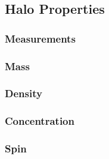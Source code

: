 \subsection{Halo Properties}
\label{subsec:halo_properties}



\subsubsection{Measurements}
\label{subsubsec:measurements}



\subsubsection{Mass}
\label{subsubsec:mass}



\subsubsection{Density}
\label{subsubsec:density}



\subsubsection{Concentration}
\label{subsubsec:concentration}



\subsubsection{Spin}
\label{subsubsec:spin}



